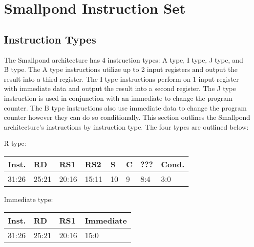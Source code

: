 \documentclass[12pt]{article}
\begin{document}
\newpage
\section{Smallpond Instruction Set}

\subsection{Instruction Types}
    The Smallpond architecture has 4 instruction types: A type, I type, J type, and B type. The A type instructions utilize up to 2 input registers and output the result into a third register. The I type instructions perform on 1 input register with immediate data and output the result into a second register. The J type instruction is used in conjunction with an immediate to change the program counter. The B type instructions also use immediate data to change the program counter however they can do so conditionally. This section outlines the Smallpond architecture's instructions by instruction type. The four types are outlined below:\\

    \begin{center}
        R type:\\
        \vspace{1em}
        \begin{tabular}{ |p{1.8cm}|p{1.5cm}|p{1.5cm}|p{1.5cm}|p{0.3cm}|p{0.3cm}|p{1.5cm}|p{1.5cm}| }
            \hline
            \textbf{Inst.} & \textbf{RD}& \textbf{RS1} & \textbf{RS2} & \textbf{S} & \textbf{C} & ??? & \textbf{Cond.}\\
            \hline
            31:26& 25:21 & 20:16 & 15:11 & 10 & 9 & 8:4 &3:0\\
            \hline
        \end{tabular}
    \end{center}
    
    \begin{center}
        Immediate type:\\
        \vspace{1em}
        \begin{tabular}{ |p{1.8cm}|p{1.5cm}|p{1.5cm}|p{6.8cm}| }
            \hline
            \textbf{Inst.} & \textbf{RD} &  \textbf{RS1} & \textbf{Immediate}\\
            \hline
            31:26& 25:21 & 20:16 &15:0\\
            \hline
        \end{tabular}
    \end{center}
    
\end{document}
